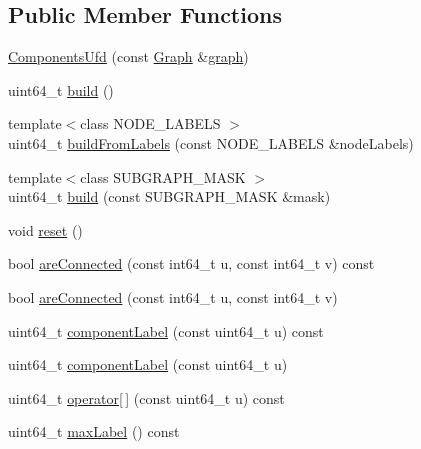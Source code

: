 \subsection*{Public Member Functions}
\begin{DoxyCompactItemize}
\item 
\hyperlink{classnifty_1_1graph_1_1ComponentsUfd_a6913c18bf7713329a42438c95674536e}{Components\+Ufd} (const \hyperlink{classnifty_1_1graph_1_1ComponentsUfd_afafd21184dee3aecdfa218eb5e72af84}{Graph} \&\hyperlink{classnifty_1_1graph_1_1ComponentsUfd_aec56e122103d4a3593b4fa437695d685}{graph})
\item 
uint64\+\_\+t \hyperlink{classnifty_1_1graph_1_1ComponentsUfd_ad41a9eae9bfab1b457630b73adc1b9d3}{build} ()
\item 
{\footnotesize template$<$class N\+O\+D\+E\+\_\+\+L\+A\+B\+E\+L\+S $>$ }\\uint64\+\_\+t \hyperlink{classnifty_1_1graph_1_1ComponentsUfd_a1a6d02426ccb3d0f22cd7ad14abfa0b7}{build\+From\+Labels} (const N\+O\+D\+E\+\_\+\+L\+A\+B\+E\+L\+S \&node\+Labels)
\item 
{\footnotesize template$<$class S\+U\+B\+G\+R\+A\+P\+H\+\_\+\+M\+A\+S\+K $>$ }\\uint64\+\_\+t \hyperlink{classnifty_1_1graph_1_1ComponentsUfd_addaee74aadc18b2b3a479dca5b0851cc}{build} (const S\+U\+B\+G\+R\+A\+P\+H\+\_\+\+M\+A\+S\+K \&mask)
\item 
void \hyperlink{classnifty_1_1graph_1_1ComponentsUfd_af5c4c45f3de807f548f07060e4ac5ed5}{reset} ()
\item 
bool \hyperlink{classnifty_1_1graph_1_1ComponentsUfd_a680c25bd16a0728b1d937d21383b0730}{are\+Connected} (const int64\+\_\+t u, const int64\+\_\+t v) const 
\item 
bool \hyperlink{classnifty_1_1graph_1_1ComponentsUfd_a530d516ae63b9765ae18671da71bee9f}{are\+Connected} (const int64\+\_\+t u, const int64\+\_\+t v)
\item 
uint64\+\_\+t \hyperlink{classnifty_1_1graph_1_1ComponentsUfd_a4af6546f5ae5c08b6ded79278988920a}{component\+Label} (const uint64\+\_\+t u) const 
\item 
uint64\+\_\+t \hyperlink{classnifty_1_1graph_1_1ComponentsUfd_ab94489c15d132f7af184f66bf2a2dc2c}{component\+Label} (const uint64\+\_\+t u)
\item 
uint64\+\_\+t \hyperlink{classnifty_1_1graph_1_1ComponentsUfd_a40829c2475f277aebdeead2723380381}{operator\mbox{[}$\,$\mbox{]}} (const uint64\+\_\+t u) const 
\item 
uint64\+\_\+t \hyperlink{classnifty_1_1graph_1_1ComponentsUfd_a5a2a7b3bf4d5f260932b8129b63b8a15}{max\+Label} () const 

\end{DoxyCompactItemize}

